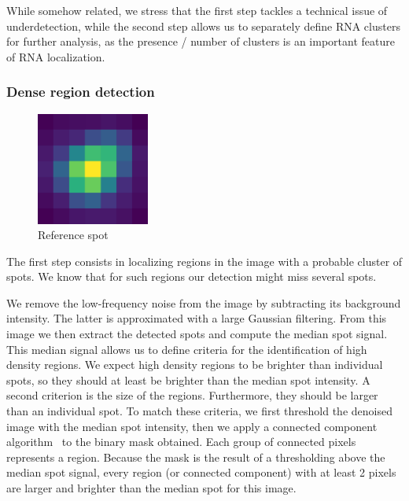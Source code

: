 While somehow related, we stress that the first step tackles a technical issue of underdetection, while the second step allows us to separately define \ac{RNA} clusters for further analysis, as the presence / number of clusters is an important feature of \ac{RNA} localization. 

\subsubsection{Dense region detection}

\begin{figure}
	\begin{center}
		\includegraphics[width=0.33\textwidth]{figures/chapter2/reference_spot}
	\caption{Reference spot}
	\label{fig:reference_spot}
	\end{center}
\end{figure}

The first step consists in localizing regions in the image with a probable cluster of spots.
We know that for such regions our detection might miss several spots.

We remove the low-frequency noise from the image by subtracting its background intensity.
The latter is approximated with a large Gaussian filtering.
From this image we then extract the detected spots and compute the median spot signal.
This median signal %
allows us to define criteria for the identification of high density regions. 
We expect high density regions to be brighter than individual spots, so they should at least be brighter than the median spot intensity. A second criterion is the size of the regions.
Furthermore, they should be larger than an individual spot.
To match these criteria, we first threshold the denoised image with the median spot intensity, then we apply a connected component algorithm~\cite{wu_connected_component_2005} to the binary mask obtained.
Each group of connected pixels represents a region.
Because the mask is the result of a thresholding above the median spot signal, every region (or connected component) with at least 2 pixels are larger and brighter than the median spot for this image.

